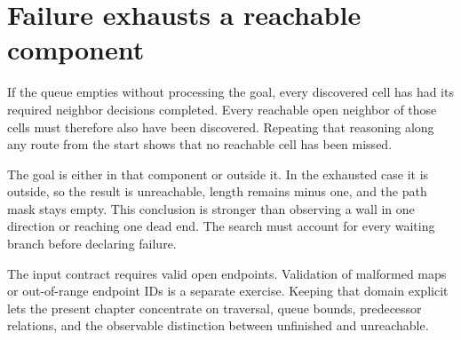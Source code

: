 \section{Failure exhausts a reachable component}\label{maze-p11}

If the queue empties without processing the goal, every discovered cell has had its required neighbor decisions completed. Every reachable open neighbor of those cells must therefore also have been discovered. Repeating that reasoning along any route from the start shows that no reachable cell has been missed.

The goal is either in that component or outside it. In the exhausted case it is outside, so the result is unreachable, length remains minus one, and the path mask stays empty. This conclusion is stronger than observing a wall in one direction or reaching one dead end. The search must account for every waiting branch before declaring failure.

The input contract requires valid open endpoints. Validation of malformed maps or out-of-range endpoint IDs is a separate exercise. Keeping that domain explicit lets the present chapter concentrate on traversal, queue bounds, predecessor relations, and the observable distinction between unfinished and unreachable.
